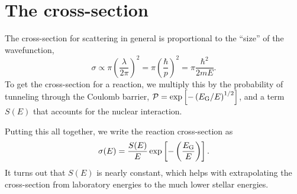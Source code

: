 \section{The cross-section}
The cross-section for scattering in general is proportional to the ``size'' of the wavefunction, 
\[\sigma\propto \pi\left(\frac{\lambda}{2\pi}\right)^{2} = \pi \left(\frac{\hbar}{p}\right)^{2} = \pi\frac{\hbar^{2}}{2mE}.\]
To get the cross-section for a reaction, we multiply this by the probability of tunneling through the Coulomb barrier, $\mathcal{P} = \exp\left[-\left(E_{\mathrm{G}}/E\right)^{1/2}\right]$, and a term $S(E)$ that accounts for the nuclear interaction.

Putting this all together, we write the reaction cross-section as
\begin{equation}\label{e.s-def}
\sigma(E) = \frac{S(E)}{E}\exp\left[-\left(\frac{E_{\mathrm{G}}}{E}\right)\right].
\end{equation}
It turns out that $S(E)$ is nearly constant, which helps with extrapolating the cross-section from laboratory energies  to the much lower stellar energies.

